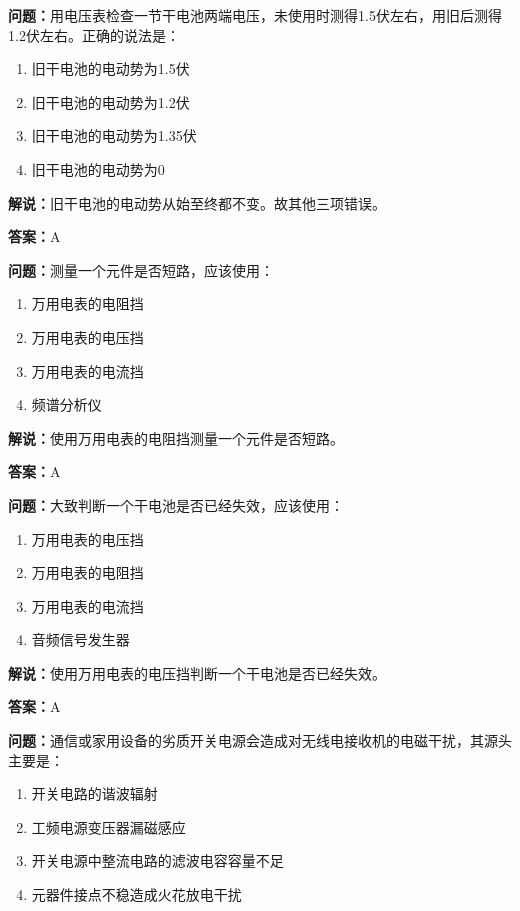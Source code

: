 \documentclass[UTF8]{ctexbook}
\begin{document}
\textbf{问题：}用电压表检查一节干电池两端电压，未使用时测得1.5伏左右，用旧后测得1.2伏左右。正确的说法是：

\begin{enumerate}[label=\Alph*), leftmargin=3em]
  \item 旧干电池的电动势为1.5伏
  \item 旧干电池的电动势为1.2伏
  \item 旧干电池的电动势为1.35伏
  \item 旧干电池的电动势为0
\end{enumerate}

\textbf{解说：}旧干电池的电动势从始至终都不变。故其他三项错误。%

\textbf{答案：}A

\textbf{问题：}测量一个元件是否短路，应该使用：

\begin{enumerate}[label=\Alph*), leftmargin=3em]
  \item 万用电表的电阻挡
  \item 万用电表的电压挡
  \item 万用电表的电流挡
  \item 频谱分析仪
\end{enumerate}

\textbf{解说：}使用万用电表的电阻挡测量一个元件是否短路。%

\textbf{答案：}A

\textbf{问题：}大致判断一个干电池是否已经失效，应该使用：

\begin{enumerate}[label=\Alph*), leftmargin=3em]
  \item 万用电表的电压挡
  \item 万用电表的电阻挡
  \item 万用电表的电流挡
  \item 音频信号发生器
\end{enumerate}

\textbf{解说：}使用万用电表的电压挡判断一个干电池是否已经失效。%

\textbf{答案：}A

\textbf{问题：}通信或家用设备的劣质开关电源会造成对无线电接收机的电磁干扰，其源头主要是：

\begin{enumerate}[label=\Alph*), leftmargin=3em]
  \item 开关电路的谐波辐射
  \item 工频电源变压器漏磁感应
  \item 开关电源中整流电路的滤波电容容量不足
  \item 元器件接点不稳造成火花放电干扰
\end{enumerate}
\end{document}
